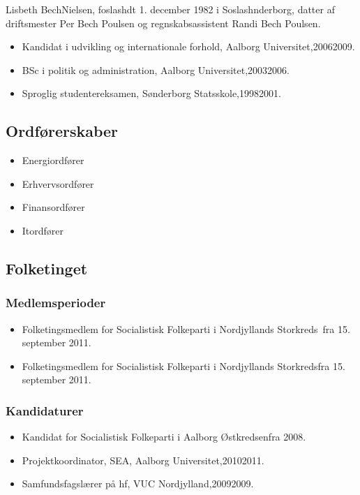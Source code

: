 \documentclass[11pt, a4paper]{awesome-cv}
\begin{document}
\makecvheader[R]
\makelettertitle
\begin{cvletter}
Lisbeth BechNielsen, foslashdt 1. december 1982 i Soslashnderborg, datter af driftsmester Per Bech Poulsen og regnskabsassistent Randi Bech Poulsen.

\begin{itemize}
\item Kandidat i udvikling og internationale forhold, Aalborg Universitet,20062009.
\item BSc i politik og administration, Aalborg Universitet,20032006.
\item Sproglig studentereksamen, Sønderborg Statsskole,19982001.
\end{itemize}
\subsection*{Ordførerskaber}
\begin{itemize}
\item Energiordfører
\item Erhvervsordfører
\item Finansordfører
\item Itordfører
\end{itemize}
\subsection*{Folketinget}
\subsubsection*{Medlemsperioder}
\begin{itemize}
\item Folketingsmedlem for Socialistisk Folkeparti i Nordjyllands Storkreds fra 15. september 2011.
\item Folketingsmedlem for Socialistisk Folkeparti i Nordjyllands Storkredsfra 15. september 2011.
\end{itemize}
\subsubsection*{Kandidaturer}
\begin{itemize}
\item Kandidat for Socialistisk Folkeparti i Aalborg Østkredsenfra 2008.
\end{itemize}
\begin{itemize}
\item Projektkoordinator, SEA, Aalborg Universitet,20102011.
\item Samfundsfagslærer på hf, VUC Nordjylland,20092009.
\end{itemize}
\end{cvletter}
\end{document}
